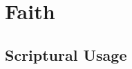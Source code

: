\section{Faith}
	\label{FAITH}
	





\subsection{Scriptural Usage} %
	\label{FAITH-SCRIPTURES}

	
	
